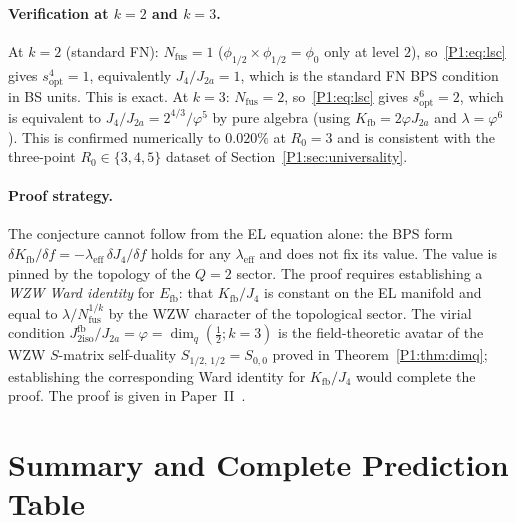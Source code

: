 \documentclass[11pt,a4paper]{article}
\theoremstyle{definition}
\theoremstyle{remark}
\newcommand{\vp}{\varphi}
\newcommand{\lam}{\lambda}
\newcommand{\Kfb}{K_{\mathrm{fb}}}
\newcommand{\Efb}{E_{\mathrm{fb}}}
\newcommand{\Jfb}{J_{2\mathrm{iso}}^{\mathrm{fb}}}
\newcommand{\Ja}{J_{2a}}
\newcommand{\Jfour}{J_{4}}
\newcommand{\sopt}{s_{\mathrm{opt}}}
\newcommand{\leff}{\lambda_{\mathrm{eff}}}
\begin{document}
\paragraph{Verification at $k=2$ and $k=3$.}
At $k=2$ (standard FN): $N_{\mathrm{fus}}=1$
($\phi_{1/2}\times\phi_{1/2}=\phi_0$ only at level $2$),
so~\eqref{P1:eq:lsc} gives $\sopt^4=1$, equivalently
$\Jfour/\Ja=1$, which is the standard FN BPS condition
in BS units.  This is exact.
At $k=3$: $N_{\mathrm{fus}}=2$, so~\eqref{P1:eq:lsc} gives
$\sopt^6=2$, which is equivalent to
$\Jfour/\Ja = 2^{4/3}/\vp^5$ by pure algebra
(using $\Kfb=2\vp\Ja$ and $\lam=\vp^6$).
This is confirmed numerically to $0.020\%$ at $R_0=3$
and is consistent with the three-point
$R_0\in\{3,4,5\}$ dataset of Section~\ref{P1:sec:universality}.

\paragraph{Proof strategy.}
The conjecture cannot follow from the EL equation alone:
the BPS form $\delta\Kfb/\delta f = -\leff\,\delta\Jfour/\delta f$
holds for any $\leff$ and does not fix its value.
The value is pinned by the topology of the $Q=2$ sector.
The proof requires establishing a \emph{WZW Ward identity}
for $\Efb$: that $\Kfb/\Jfour$ is constant on the EL
manifold and equal to $\lam/N_{\mathrm{fus}}^{1/k}$ by the
WZW character of the topological sector.
The virial condition $\Jfb/\Ja = \vp = \dim_q(\tfrac{1}{2};k{=}3)$
is the field-theoretic avatar of the WZW $S$-matrix
self-duality $S_{1/2,\,1/2}=S_{0,0}$ proved in
Theorem~\ref{P1:thm:dimq}; establishing the corresponding
Ward identity for $\Kfb/\Jfour$ would complete the proof.
The proof is given in Paper~II~\cite{Paper2}.

\section{Summary and Complete Prediction Table}
\label{P1:sec:summary}
\end{document}
